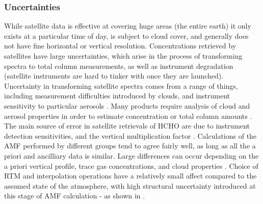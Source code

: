   \subsubsection{Uncertainties}
    While satellite data is effective at covering huge areas (the entire earth) it only exists at a particular time of day, is subject to cloud cover, and generally does not have fine horizontal or vertical resolution.
    Concentrations retrieved by satellites have large uncertainties, which arise in the process of transforming spectra to total column measurements, as well as instrument degradation (satellite instruments are hard to tinker with once they are launched).
    Uncertainty in transforming satellite spectra comes from a range of things, including measurement difficulties introduced by clouds, and instrument sensitivity to particular aerosols \parencite{Millet2006}.
    Many products require analysis of cloud and aerosol properties in order to estimate concentration or total column amounts \parencite{Palmer2001,Palmer2003, Marais2012, Vasilkov2017}.
    The main source of error in satellite retrievals of HCHO are due to instrument detection sensitivities, and the vertical multiplication factor \parencite{Millet2006}.
    Calculations of the AMF performed by different groups tend to agree fairly well, as long as all the a priori and ancilliary data is similar.
    Large differences can occur depending on the a priori vertical profile, trace gas concentrations, and cloud properties \parencite{Lorente2017}.
    Choice of RTM and interpolation operations have a relatively small affect compared to the assumed state of the atmosphere, with high structural uncertainty introduced at this stage of AMF calculation - as shown in \textcite{Lorente2017}.
    

